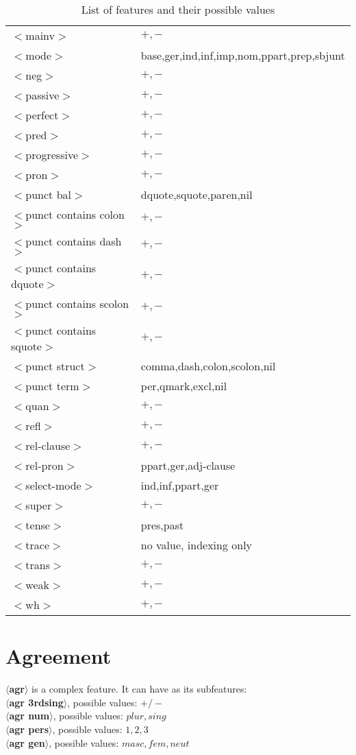 \begin{table}[hbt]
\begin{tabular}{|l|l|}
$<$mainv$>$&$+,-$\\
$<$mode$>$&base,ger,ind,inf,imp,nom,ppart,prep,sbjunt\\
$<$neg$>$&$+,-$\\
$<$passive$>$&$+,-$\\
$<$perfect$>$&$+,-$\\
$<$pred$>$&$+,-$\\
$<$progressive$>$&$+,-$\\
$<$pron$>$&$+,-$\\
$<$punct bal$>$&dquote,squote,paren,nil\\
$<$punct contains colon$>$&$+,-$\\
$<$punct contains dash$>$&$+,-$\\
$<$punct contains dquote$>$&$+,-$\\
$<$punct contains scolon$>$&$+,-$\\
$<$punct contains squote$>$&$+,-$\\
$<$punct struct$>$&comma,dash,colon,scolon,nil\\
$<$punct term$>$&per,qmark,excl,nil\\
$<$quan$>$&$+,-$\\
$<$refl$>$&$+,-$\\
$<$rel-clause$>$&$+,-$\\
$<$rel-pron$>$&ppart,ger,adj-clause\\
$<$select-mode$>$&ind,inf,ppart,ger\\
$<$super$>$&$+,-$\\
$<$tense$>$&pres,past\\
$<$trace$>$&no value, indexing only\\
$<$trans$>$&$+,-$\\
$<$weak$>$&$+,-$\\
$<$wh$>$&$+,-$\\
\hline
\end{tabular}
\caption{List of features and their possible values}
\label{feature-table}
\end{table}

\normalsize


\section{Agreement}
{\bf $\langle$agr$\rangle$} is a complex feature.
It can have as its subfeatures:\\
{\bf $\langle$agr 3rdsing$\rangle$}, possible values: {\bf $+/-$ }\\
{\bf $\langle$agr num$\rangle$}, possible values: {\bf $plur,sing$ }\\
{\bf $\langle$agr pers$\rangle$}, possible values: {\bf $1,2,3$ }\\
{\bf $\langle$agr gen$\rangle$}, possible values: {\bf $masc,fem,neut$ }

